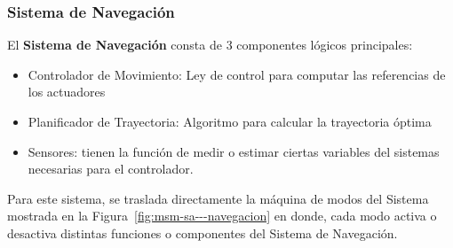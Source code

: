 \subsubsection{Sistema de Navegación}
El \textbf{Sistema de Navegación} consta de 3 componentes lógicos principales:
\begin{itemize}
	\item Controlador de Movimiento: Ley de control para computar las referencias de los actuadores
	\item Planificador de Trayectoria: Algoritmo para calcular la trayectoria óptima
	\item Sensores: tienen la función de medir o estimar ciertas variables del sistemas necesarias para el controlador.
\end{itemize}

Para este sistema, se traslada directamente la máquina de modos del Sistema mostrada en la Figura~\ref{fig:msm-sa---navegacion} en donde, cada modo activa o desactiva distintas funciones o componentes del Sistema de Navegación.

